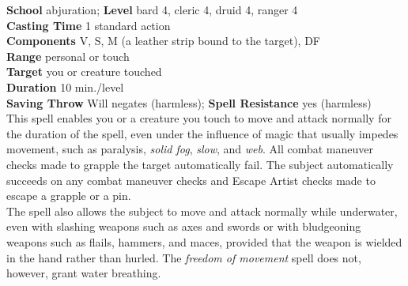 \textbf{School} abjuration; \textbf{Level} bard 4, cleric 4, druid 4, ranger 4\\
\textbf{Casting Time} 1 standard action\\
\textbf{Components} V, S, M (a leather strip bound to the target), DF\\
\textbf{Range} personal or touch\\
\textbf{Target} you or creature touched\\
\textbf{Duration} 10 min./level\\
\textbf{Saving Throw }Will negates (harmless); \textbf{Spell Resistance} yes (harmless)\\
This spell enables you or a creature you touch to move and attack normally for the duration of the spell, even under the influence of magic that usually impedes movement, such as paralysis, \textit{solid fog}, \textit{slow}, and \textit{web}. All combat maneuver checks made to grapple the target automatically fail. The subject automatically succeeds on any combat maneuver checks and Escape Artist checks made to escape a grapple or a pin.\\
The spell also allows the subject to move and attack normally while underwater, even with slashing weapons such as axes and swords or with bludgeoning weapons such as flails, hammers, and maces, provided that the weapon is wielded in the hand rather than hurled. The \textit{freedom of movement }spell does not, however, grant water breathing.\\
